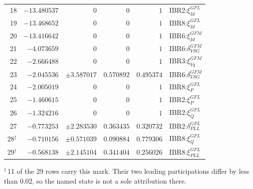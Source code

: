 \begin{longtable}{@{}r r r r r l@{}}
18 & $-13.480537$ & $0$ & $0$ & $1$ & IBR2:$\xi_{Id}^{GFL}$ \\ 
19 & $-13.468652$ & $0$ & $0$ & $1$ & IBR8:$\xi_{Id}^{GFL}$ \\ 
20 & $-13.416642$ & $0$ & $0$ & $1$ & IBR6:$\xi_{Id}^{GFM}$ \\ 
21 & $-4.073659$ & $0$ & $0$ & $1$ & IBR6:$\delta_{VSG}^{GFM}$ \\ 
22 & $-2.666488$ & $0$ & $0$ & $1$ & IBR3:$\xi_{Vq}^{GFM}$ \\ 
23 & $-2.045536$ & $\pm3.587017$ & $0.570892$ & $0.495374$ & IBR6:$\delta_{VSG}^{GFM}$ \\ 
24 & $-2.005019$ & $0$ & $0$ & $1$ & IBR8:$\xi_{P}^{GFL}$ \\ 
25 & $-1.460615$ & $0$ & $0$ & $1$ & IBR2:$\xi_{P}^{GFL}$ \\ 
26 & $-1.324216$ & $0$ & $0$ & $1$ & IBR2:$\xi_{Q}^{GFL}$ \\ 
27 & $-0.773253$ & $\pm2.283530$ & $0.363435$ & $0.320732$ & IBR2:$\delta_{PLL}^{GFL}$ \\ 
28$^{\dagger}$ & $-0.710156$ & $\pm0.571039$ & $0.090884$ & $0.779306$ & IBR8:$\xi_{Q}^{GFL}$ \\ 
29$^{\dagger}$ & $-0.568138$ & $\pm2.145104$ & $0.341404$ & $0.256026$ & IBR8:$\xi_{PLL}^{GFL}$ \\ 
\bottomrule
\end{longtable}
\noindent$^{\dagger}$\,11 of the 29 rows carry this mark. Their two leading participations differ by less than 0.02, so the named state is not a sole attribution there.\par
\endgroup
